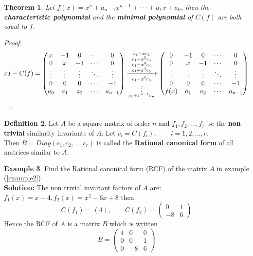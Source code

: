 \documentclass{article}
\newtheorem{thm}{Theorem}[section]
\theoremstyle{definition}
\newtheorem{defn}[thm]{Definition}
\newtheorem{exmp}[thm]{Example}
\theoremstyle{remark}
\begin{document}
\begin{thm}
Let $f(x)=x^n+a_{n-1}x^{n-1}+\cdot\cdot\cdot+a_1x+a_0$, then the \textbf{characteristic polynomial} and the \textbf{minimal polynomial} of $C(f)$ are both equal to $f$.
\end{thm}
\begin{proof}

\[xI-C(f)=
\begin{pmatrix}
      x & -1 & 0   &\cdots & 0 \\
      0 & x & -1  &\cdots & 0 \\
      \vdots & \vdots & \vdots&  \ddots & \vdots \\
      0 & 0 & 0   &\cdots & -1 \\
      a_0 & a_1 & a_2 & \cdots & a_{n-1}
    \end{pmatrix}
\xrightarrow
 [%
  \substack{c_1+x^5c_6\\ \vdots\\c_1+x^{n-1}c_n}
 ]
 {%
  \substack{c_1+xc_2\\c_1+x^2c_3\\c_1+x^3c_4\\c_1+x^4c_5}
 }
\begin{pmatrix}
      0 & -1 & 0   &\cdots & 0 \\
      0 & x & -1  &\cdots & 0 \\
      \vdots & \vdots & \vdots&  \ddots & \vdots \\
      0 & 0 & 0   &\cdots & -1 \\
      f(x) & a_1 & a_2 & \cdots & a_{n-1}
    \end{pmatrix}
\]
\end{proof}

\begin{defn}
Let $A$ be a square matrix of order $n$ and $f_1,f_2,...,f_r$ be the \textbf{non trivial} similarity invariants of $A$.
Let $c_i=C(f_i),\qquad i=1,2,...,r$.\\
Then $B=Diag(c_1,c_2,...,c_r)$ is called the \textbf{Rational canonical form} of all matrices similar to $A$.
\end{defn}
\begin{exmp}
Find the Rational canonical form (RCF) of the matrix $A$ in example (\ref{example2})\\
\textbf{Solution:} The non trivial invariant factors of $A$ are: $f_1(x)=x-4, f_2(x)=x^2-6x+8$ then
$$C(f_1)=(4),\qquad C(f_2)=\left(
    \begin{matrix}
      0 & 1  \\
      -8 & 6
    \end{matrix}
    \right)$$
Hence the RCF of $A$ is a matrix $B$ which is written
$$B=\left(
    \begin{matrix}
      4 & 0 & 0 \\
      0 & 0 & 1\\
      0 & -8& 6
    \end{matrix}
    \right)$$
\end{exmp}
\end{document}

